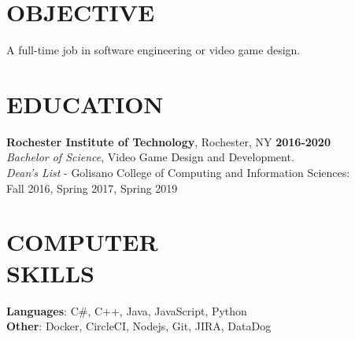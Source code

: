 \documentclass[line,margin]{res}
\begin{document}
\begin{resume}

\section{OBJECTIVE}
A full-time job in software engineering or video game design.



\section{EDUCATION}
\textbf{Rochester Institute of Technology}, Rochester, NY\hfill
    \textbf{2016-2020}\\
{\sl Bachelor of Science}, Video Game Design and Development.
\\
{\sl Dean's List} - Golisano College of Computing and Information Sciences:\hfill \\ Fall 2016, Spring 2017, Spring 2019
\section{COMPUTER\\SKILLS}
\textbf{Languages}: C\#, C++, Java, JavaScript, Python \\
\textbf{Other}: Docker, CircleCI, Nodejs, Git, JIRA, DataDog\\

\end{resume}
\end{document}

